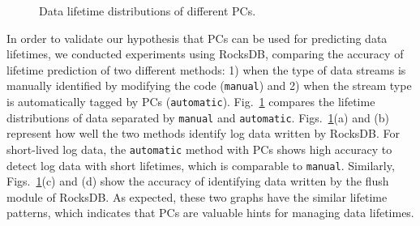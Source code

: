 \begin{figure}[!t]
\centering
\vspace{-10pt}
\hspace{1pt}
\hfill
\vspace{-10pt}
\caption{Data lifetime distributions of different PCs.} 
\label{fig:types_and_PCs}
\vspace{-15pt}
\end{figure}

In order to validate our hypothesis  that PCs can be used for predicting 
data lifetimes, we
conducted experiments using RocksDB, comparing the accuracy of lifetime
prediction of two different methods: 1) when the type of data streams is
manually identified by modifying the code (\texttt{manual}) and 2) when the
stream type is automatically tagged by PCs (\texttt{automatic}).
Fig.~\ref{fig:types_and_PCs} compares the lifetime distributions of data
separated by \texttt{manual} and \texttt{automatic}.
Figs.~\ref{fig:types_and_PCs}(a) and (b) represent how well the two methods
identify log data written by RocksDB. 
For short-lived log data, the \texttt{automatic} method with PCs
shows high accuracy to detect log data with short lifetimes, which is
comparable to \texttt{manual}. Similarly, Figs.~\ref{fig:types_and_PCs}(c) and
(d) show the accuracy of identifying data written by the flush module of
RocksDB.  As expected, these two graphs have the similar lifetime patterns,
which indicates that PCs are valuable hints for managing data lifetimes.

